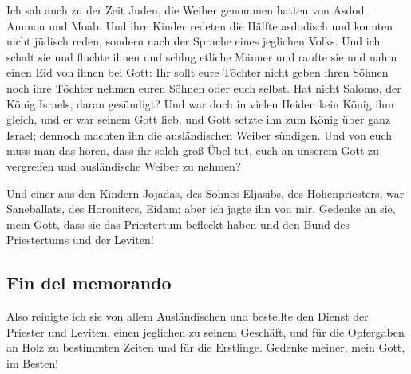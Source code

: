  Ich sah auch zu der Zeit Juden, die Weiber genommen
hatten von Asdod, Ammon und Moab.  Und ihre Kinder
redeten die Hälfte asdodisch und konnten nicht jüdisch reden, sondern
nach der Sprache eines jeglichen Volks.  Und ich schalt
sie und fluchte ihnen und schlug etliche Männer und raufte sie und nahm
einen Eid von ihnen bei Gott: Ihr sollt eure Töchter nicht geben ihren
Söhnen noch ihre Töchter nehmen euren Söhnen oder euch selbst.
 Hat nicht Salomo, der König Israels, daran gesündigt?
Und war doch in vielen Heiden kein König ihm gleich, und er war seinem
Gott lieb, und Gott setzte ihn zum König über ganz Israel; dennoch
machten ihn die ausländischen Weiber sündigen.  Und von
euch muss man das hören, dass ihr solch groß Übel tut, euch an unserem
Gott zu vergreifen und ausländische Weiber zu nehmen?

 Und einer aus den Kindern Jojadas, des Sohnes Eljasibs,
des Hohenpriesters, war Saneballats, des Horoniters, Eidam; aber ich
jagte ihn von mir.  Gedenke an sie, mein Gott, dass sie
das Priestertum befleckt haben und den Bund des Priestertums und der
Leviten!

\hypertarget{fin-del-memorando}{%
\subsection{Fin del memorando}\label{fin-del-memorando}}

 Also reinigte ich sie von allem Ausländischen und
bestellte den Dienst der Priester und Leviten, einen jeglichen zu seinem
Geschäft,  und für die Opfergaben an Holz zu bestimmten
Zeiten und für die Erstlinge. Gedenke meiner, mein Gott, im Besten!
